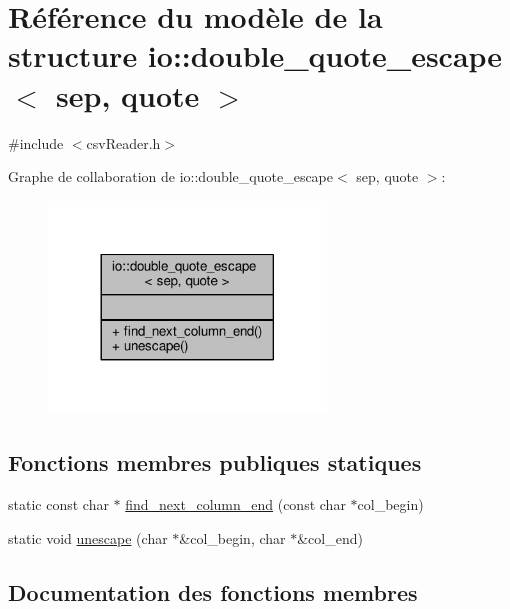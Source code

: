 \hypertarget{structio_1_1double__quote__escape}{}\section{Référence du modèle de la structure io\+:\+:double\+\_\+quote\+\_\+escape$<$ sep, quote $>$}
\label{structio_1_1double__quote__escape}


{\ttfamily \#include $<$csv\+Reader.\+h$>$}



Graphe de collaboration de io\+:\+:double\+\_\+quote\+\_\+escape$<$ sep, quote $>$\+:
\nopagebreak
\begin{figure}[H]
\begin{center}
\leavevmode
\includegraphics[width=209pt]{structio_1_1double__quote__escape__coll__graph}
\end{center}
\end{figure}
\subsection*{Fonctions membres publiques statiques}
\begin{DoxyCompactItemize}
\item 
static const char $\ast$ \hyperlink{structio_1_1double__quote__escape_a30070914039ca8a20f716fbf53d68c41}{find\+\_\+next\+\_\+column\+\_\+end} (const char $\ast$col\+\_\+begin)
\item 
static void \hyperlink{structio_1_1double__quote__escape_a02e332751916fbdb7b35c238d690e580}{unescape} (char $\ast$\&col\+\_\+begin, char $\ast$\&col\+\_\+end)
\end{DoxyCompactItemize}


\subsection{Documentation des fonctions membres}
\mbox{\label{structio_1_1double__quote__escape_a30070914039ca8a20f716fbf53d68c41}} 
